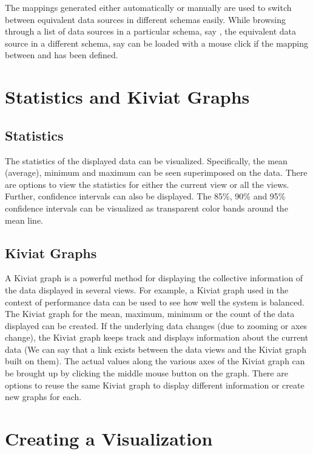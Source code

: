 The mappings generated either automatically or manually are used to
switch between equivalent data sources in different schemas
easily. While browsing through a list of data sources in a particular
schema, say , the equivalent data source in a different
schema, say  can be loaded with a mouse click if the
mapping between  and  has been defined.

\section{Statistics and Kiviat Graphs}

\subsection{Statistics}

The statistics of the displayed data can be visualized. Specifically,
the mean (average), minimum and maximum can be seen superimposed on
the data.  There are options to view the statistics for either the
current view or all the views.  Further, confidence intervals can also
be displayed.  The 85\%, 90\% and 95\% confidence intervals can be
visualized as transparent color bands around the mean line.

\subsection{Kiviat Graphs}

A Kiviat graph is a powerful method for displaying the collective
information of the data displayed in several views. For example, a
Kiviat graph used in the context of performance data can be used to
see how well the system is balanced. The Kiviat graph for the mean,
maximum, minimum or the count of the data displayed can be created. If
the underlying data changes (due to zooming or axes change), the
Kiviat graph keeps track and displays information about the current
data (We can say that a link exists between the data views and the
Kiviat graph built on them). The actual values along the various axes
of the Kiviat graph can be brought up by clicking the middle mouse
button on the graph. There are options to reuse the same Kiviat graph
to display different information or create new graphs for each.

\section{Creating a Visualization}

